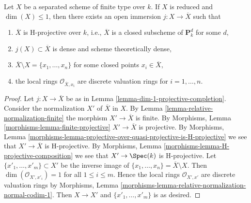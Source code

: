 \begin{lemma}
\label{lemma-reduced-dim-1-projective-completion}
Let $X$ be a separated scheme of finite type over $k$.
If $X$ is reduced and $\dim(X) \leq 1$, then there exists
an open immersion $j : X \to \overline{X}$ such that
\begin{enumerate}
\item $\overline{X}$ is H-projective over $k$, i.e., $\overline{X}$
is a closed subscheme of $\mathbf{P}^d_k$ for some $d$,
\item $j(X) \subset \overline{X}$ is dense and scheme
theoretically dense,
\item $\overline{X} \setminus X = \{x_1, \ldots, x_n\}$
for some closed points $x_i \in \overline{X}$,
\item the local rings $\mathcal{O}_{\overline{X}, x_i}$
are discrete valuation rings for $i = 1, \ldots, n$.
\end{enumerate}
\end{lemma}

\begin{proof}
Let $j : X \to \overline{X}$ be as in
Lemma \ref{lemma-dim-1-projective-completion}.
Consider the normalization $X'$ of $\overline{X}$ in
$X$. By Lemma \ref{lemma-relative-normalization-finite}
the morphism $X' \to \overline{X}$ is finite.
By Morphisms, Lemma \ref{morphisms-lemma-finite-projective}
$X' \to \overline{X}$ is projective. By Morphisms, Lemma
\ref{morphisms-lemma-projective-over-quasi-projective-is-H-projective}
we see that $X' \to \overline{X}$ is H-projective.
By Morphisms, Lemma \ref{morphisms-lemma-H-projective-composition}
we see that $X' \to \Spec(k)$ is H-projective.
Let $\{x'_1, \ldots, x'_m\} \subset X'$ be the inverse
image of $\{x_1, \ldots, x_n\} = \overline{X} \setminus X$.
Then $\dim(\mathcal{O}_{X', x'_i}) = 1$ for all $1 \leq i \leq m$.
Hence the local rings $\mathcal{O}_{X', x'}$
are discrete valuation rings by
Morphisms, Lemma
\ref{morphisms-lemma-relative-normalization-normal-codim-1}.
Then $X \to X'$ and $\{x'_1, \ldots, x'_m\}$ is as desired.
\end{proof}

